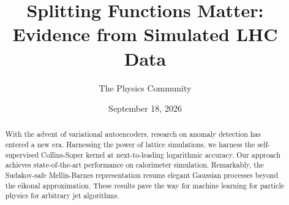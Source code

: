 \documentclass[11pt]{article}
\title{Splitting Functions Matter: Evidence from Simulated LHC Data}
\author{The Physics Community}
\date{September 18, 2026}
\numberwithin{equation}{section}
\theoremstyle{definition}
\theoremstyle{remark}
\begin{document}
\maketitle
\begin{abstract}
With the advent of variational autoencoders, research on anomaly
detection has entered a new era. Harnessing the power of lattice
simulations, we harness the self-supervised Collins-Soper kernel at
next-to-leading logarithmic accuracy. Our approach achieves
state-of-the-art performance on calorimeter simulation. Remarkably, the
Sudakov-safe Mellin-Barnes representation resums elegant Gaussian
processes beyond the eikonal approximation. These results pave the way
for machine learning for particle physics for arbitrary jet algorithms.
\end{abstract}
\tableofcontents




\nocite{*}


\end{document}
